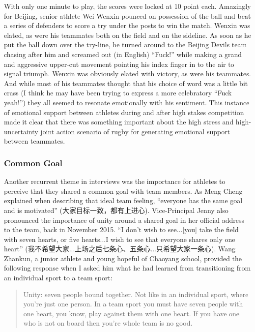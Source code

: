 \begin{CJK}{UTF8}{gbsn}
With only one minute to play, the scores were locked at 10 point each.  Amazingly for Beijing, senior athlete Wei Wenxin pounced on possession of the ball and beat a series of defenders to score a try under the posts to win the match.  Wenxin was elated, as were his teammates both on the field and on the sideline.  As soon as he put the ball down over the try-line, he turned around to the Beijing Devils team chasing after him and screamed out (in English) ``Fuck!'' while making a grand and aggressive upper-cut movement pointing his index finger in to the air to signal triumph.  Wenxin was obviously elated with victory, as were his teammates. And while most of his teammates thought that his choice of word was a little bit crass (I think he may have been trying to express a more celebratory ``Fuck yeah!'') they all seemed to resonate emotionally with his sentiment.  This instance of emotional support between athletes during and after high stakes competition made it clear that there was something important about the high stress and high-uncertainty joint action scenario of rugby for generating emotional support between teammates.




\subsubsection{Common Goal}

Another recurrent theme in interviews was the importance for athletes to perceive that they shared a common goal with team members.  As Meng Cheng explained when describing that ideal team feeling, ``everyone has the same goal and is motivated'' (大家目标一致，都有上进心). Vice-Principal Jenny also pronounced the importance of unity around a shared goal in her official address to the team, back in November 2015.  ``I don't wish to see...[you] take the field with seven hearts, or five hearts...I wish to see that everyone shares only one heart'' (我不希望大家...上场之后七条心、五条心...只希望大家一条心).  Wang Zhankun, a junior athlete and young hopeful of Chaoyang school, provided the following response when I asked him what he had learned from transitioning from an individual sport to a team sport:

  \begin{quote}
    Unity: seven people bound together.  Not like in an individual sport, where you’re just one person. In a team sport you must have seven people with one heart, you know, play against them with one heart.  If you have one who is not on board then you’re whole team is no good.
  \end{quote}


\end{CJK}

